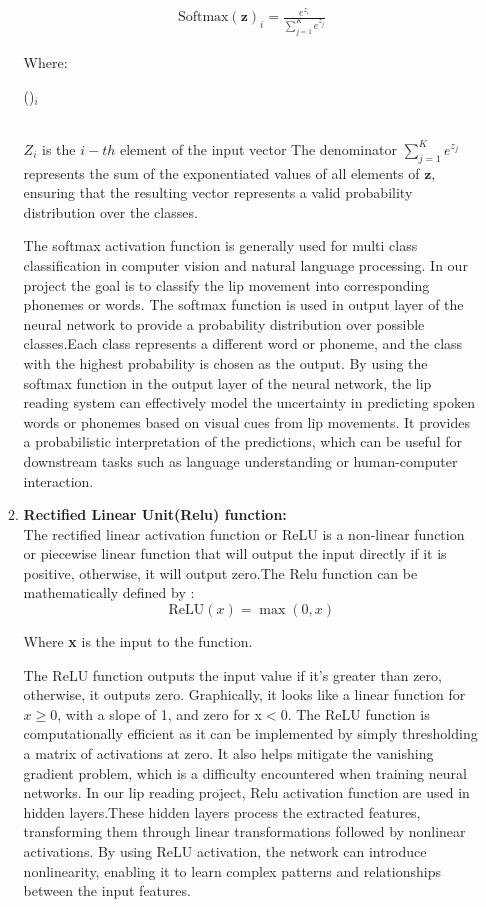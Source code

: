 \begin{enumerate}
\begin{enumerate}
        \begin{align*}
            \text{Softmax}(\mathbf{z})_i = \frac{e^{z_i}}{\sum_{j=1}^{K} e^{z_j}}
        \end{align*}

Where:

()$_i$ 


 \\

\(Z_i\)  is the \(i-th\) element of the input vector
The denominator \( \sum_{j=1}^{K} e^{z_j} \) represents the sum of the exponentiated values of all elements of \( \mathbf{z} \), ensuring that the resulting vector represents a valid probability distribution over the classes.

The softmax activation function is generally used for multi class classification in computer vision and natural language processing. In our project the goal is to classify the lip movement into corresponding phonemes or words. The softmax function is used in output layer of the neural network to provide a probability distribution over possible classes.Each class represents a different word or phoneme, and the class with the highest probability is chosen as the output. By using the softmax function in the output layer of the neural network, the lip reading system can effectively model the uncertainty in predicting spoken words or phonemes based on visual cues from lip movements. It provides a probabilistic interpretation of the predictions, which can be useful for downstream tasks such as language understanding or human-computer interaction.

\item \textbf{Rectified Linear Unit(Relu) function:}\\
The rectified linear activation function or ReLU is a non-linear function or piecewise linear function that will output the input directly if it is positive, otherwise, it will output zero.The Relu function can be mathematically defined by :
   \[ \text{ReLU}(x) = \max(0, x) \]

Where \textbf{x} is the input to the function.

 The ReLU function outputs the input value if it's greater than zero, otherwise, it outputs zero. Graphically, it looks like a linear function for $x\geq0$, with a slope of 1, and zero for x$<$0. The ReLU function is computationally efficient as it can be implemented by simply thresholding a matrix of activations at zero. It also helps mitigate the vanishing gradient problem, which is a difficulty encountered when training neural networks. In our lip reading project, Relu activation function are used in hidden layers.These hidden layers process the extracted features, transforming them through linear transformations followed by nonlinear activations. By using ReLU activation, the network can introduce nonlinearity, enabling it to learn complex patterns and relationships between the input features.
\end{enumerate}   


\end{enumerate}
